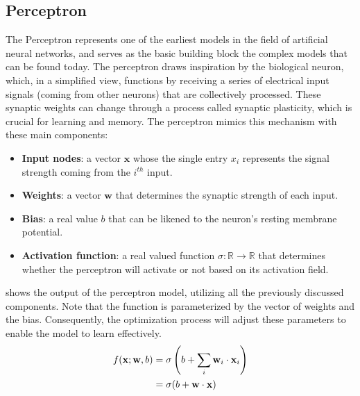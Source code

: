 \subsection{Perceptron}
The Perceptron  represents one of the earliest models
in the field of artificial neural networks, and serves as the basic building
block the complex models that can be found today. The perceptron draws
inspiration by the biological neuron, which, in a simplified view, functions by
receiving a series of electrical input signals (coming from other neurons) that
are collectively processed. These synaptic
weights can change through a process called synaptic plasticity, which is
crucial for learning and memory.
The perceptron mimics this mechanism with these main components:
\begin{itemize}
    \item \textbf{Input nodes}: a vector $\mathbf{x}$ whose the single entry
    $x_i$ represents the signal strength coming from the $i^{th}$ input.
    \item \textbf{Weights}: a vector $\mathbf{w}$ that determines the synaptic
    strength of each input.
    \item \textbf{Bias}: a real value $b$ that can be likened to the neuron's
    resting membrane potential.
    \item \textbf{Activation function}: a real valued function $\sigma:
    \mathbb{R} \to \mathbb{R}$ that determines whether the perceptron will
    activate or not based on its activation field.
\end{itemize}
 shows the output of the perceptron model, utilizing all the
previously discussed components. Note that the function is parameterized by the
vector of weights and the bias. Consequently, the optimization process will
adjust these parameters to enable the model to learn effectively.
\begin{equation}
    \labeq{2_13}
    \begin{split}
    f(\mathbf{x}; \mathbf{w}, b) &= \sigma \left( b + \sum_{i} \mathbf{w}_i \cdot \mathbf{x}_i \right)\\
    &= \sigma (b + \mathbf{w} \cdot \mathbf{x})
    \end{split}
\end{equation}
